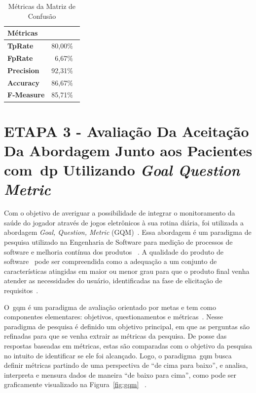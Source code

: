 \begin{table}[!htbp]
\label{table:metricasmatrizconfusao}
\caption{Métricas da Matriz de Confusão}
\centering
\begin{tabular}{|l|r|}
\hline
\multicolumn{2}{|l|}{\textbf{Métricas}} \\ \hline
\textbf{TpRate}                    & 80,00$\%$\                 \\ \hline
\textbf{FpRate}                    & 6,67$\%$\                \\ \hline
\textbf{Precision}                 & 92,31$\%$\                \\ \hline
\textbf{Accuracy}                  & 86,67$\%$\                \\ \hline
\textbf{F-Measure}                 & 85,71$\%$\                \\ \hline
\end{tabular}
\end{table}








\section{ETAPA 3 - Avaliação Da Aceitação Da Abordagem Junto aos Pacientes com~\ac{dp} Utilizando \textit{Goal Question Metric}}\label{gqm_usuarios}


Com o objetivo de averiguar a possibilidade de integrar o monitoramento da saúde do jogador através de jogos eletrônicos à sua rotina diária, foi utilizada a abordagem \textit{Goal, Question, Metric} (GQM)~\cite{van1999goal}. Essa abordagem é um paradigma de pesquisa utilizado na Engenharia de Software para medição de processos de software e melhoria contínua dos produtos ~\cite{saraiva2006,elicquest05}. A qualidade do produto de software~\cite{saraiva2006} pode ser compreendida como a adequação a um conjunto de características atingidas em maior ou menor grau para que o produto final venha atender as necessidades do usuário, identificadas na fase de elicitação de requisitos~\cite{elicquest05}.

O~\ac{gqm} é um paradigma de avaliação orientado por metas e tem como componentes elementares: objetivos, questionamentos e métricas~\cite{saraiva2006}. Nesse paradigma de pesquisa é definido um objetivo principal, em que as perguntas são refinadas para que se venha extrair as métricas da pesquisa. De posse das respostas baseadas em métricas, estas são comparadas com o objetivo da pesquisa no intuito de identificar se ele foi alcançado. Logo, o paradigma~\ac{gqm} busca definir métricas partindo de uma perspectiva de ``de cima para baixo'', e analisa, interpreta e mensura dados de maneira ``de baixo para cima'', como pode ser graficamente visualizado na Figura~\ref{fig:gqm} ~\cite{van1999goal}. 


